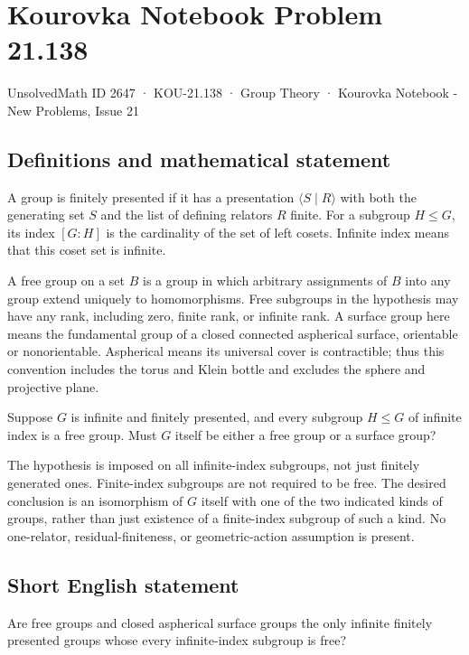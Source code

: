 \documentclass[11pt,a4paper]{article}
\begin{document}
\section*{Kourovka Notebook Problem 21.138}\label{2647}
{\small UnsolvedMath ID 2647 · KOU-21.138 · Group Theory · Kourovka Notebook - New Problems, Issue 21}
\subsection{Definitions and mathematical statement}
A group is finitely presented if it has a presentation $\langle S\mid R\rangle$ with both the generating set $S$ and the list of defining relators $R$ finite. For a subgroup $H\le G$, its index $[G:H]$ is the cardinality of the set of left cosets. Infinite index means that this coset set is infinite.

A free group on a set $B$ is a group in which arbitrary assignments of $B$ into any group extend uniquely to homomorphisms. Free subgroups in the hypothesis may have any rank, including zero, finite rank, or infinite rank. A surface group here means the fundamental group of a closed connected aspherical surface, orientable or nonorientable. Aspherical means its universal cover is contractible; thus this convention includes the torus and Klein bottle and excludes the sphere and projective plane.

Suppose $G$ is infinite and finitely presented, and every subgroup $H\le G$ of infinite index is a free group. Must $G$ itself be either a free group or a surface group?

The hypothesis is imposed on all infinite-index subgroups, not just finitely generated ones. Finite-index subgroups are not required to be free. The desired conclusion is an isomorphism of $G$ itself with one of the two indicated kinds of groups, rather than just existence of a finite-index subgroup of such a kind. No one-relator, residual-finiteness, or geometric-action assumption is present.
\subsection{Short English statement}
Are free groups and closed aspherical surface groups the only infinite finitely presented groups whose every infinite-index subgroup is free?
\end{document}
